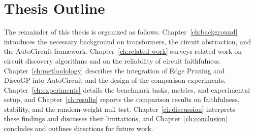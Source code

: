 \section{Thesis Outline}\label{sec:outline}

The remainder of this thesis is organized as follows. Chapter~\ref{ch:background} introduces the necessary background on transformers, the circuit abstraction, and the AutoCircuit framework. Chapter~\ref{ch:related-work} surveys related work on circuit discovery algorithms and on the reliability of circuit faithfulness. Chapter~\ref{ch:methodology} describes the integration of Edge Pruning and DiscoGP into AutoCircuit and the design of the comparison experiments. Chapter~\ref{ch:experiments} details the benchmark tasks, metrics, and experimental setup, and Chapter~\ref{ch:results} reports the comparison results on faithfulness, stability, and the random-weight null test. Chapter~\ref{ch:discussion} interprets these findings and discusses their limitations, and Chapter~\ref{ch:conclusion} concludes and outlines directions for future work.
